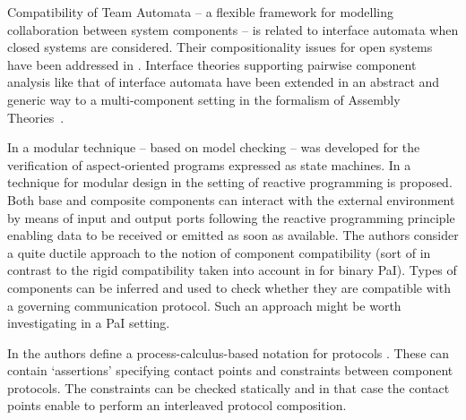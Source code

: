  Compatibility of Team Automata \cite{CK13} -- 
a flexible framework for modelling collaboration between system components -- is related to interface automata when closed systems are considered.
Their 
compositionality issues for open systems have been addressed in  \cite{BK03,BHK-ictac20}.
Interface theories supporting pairwise component analysis like that of interface automata have been extended in an abstract and generic way to a multi-component setting
in the formalism of Assembly Theories~\cite{HK-acta15}.

 
 
In \cite{KFG04} a modular technique  -- based on model checking --  was developed for the verification of 
aspect-oriented programs expressed as state machines.
 In \cite{CMV18,SGV20} a technique for modular design in the setting of reactive programming
is proposed. Both base and composite components can interact with the external environment by means of input and output ports following the reactive programming
principle enabling data to be received or emitted as soon as available.
The authors consider a quite ductile approach to the notion of component compatibility 
(sort of in contrast to the rigid compatibility taken into account in \cite{BdLH19} for binary PaI). 
Types of components can be inferred and used to
 check whether they are compatible with a governing communication protocol.
 Such an approach might be worth investigating in a PaI setting.

In \cite{BOV23} the authors define a process-calculus-based notation for protocols .
These can contain ‘assertions’ specifying contact points and constraints between component protocols. 
The constraints can be checked statically and in that case the contact points enable to perform an interleaved protocol composition.








